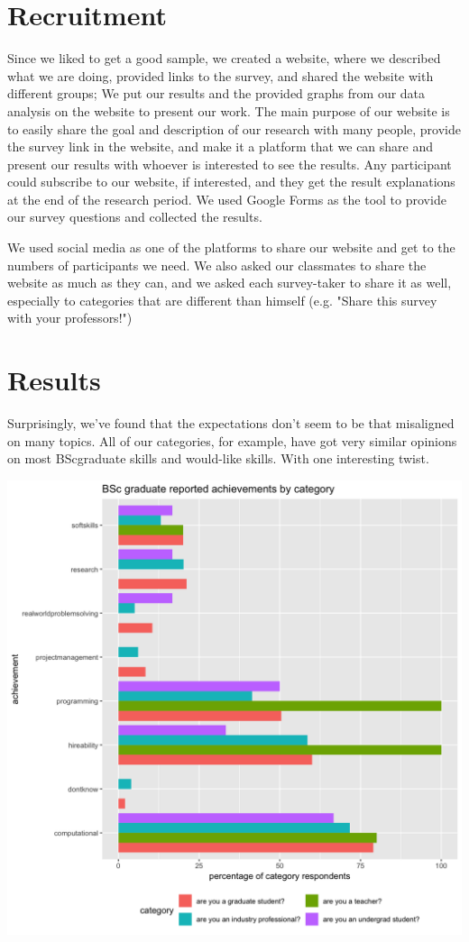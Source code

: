 \documentclass{sigchi}
\begin{document}
\section{Recruitment}
Since we liked to get a good sample, we created a website, where we described what we are doing, provided links to the survey, and shared the website with different groups; We put our results and the provided graphs from our data analysis on the website to present our work. The main purpose of our website is to easily share the goal and description of our research with many people, provide the survey link in the website, and make it a platform that we can share and present our results with whoever is interested to see the results. Any participant could subscribe to our website, if interested, and they get the result explanations at the end of the research period. We used Google Forms as the tool to provide our survey questions and collected the results.  

 We used social media as one of the platforms to share our website and get to the numbers of participants we need. We also asked our classmates to share the website as much as they can, and we asked each survey-taker to share it as well, especially to categories that are different than himself (e.g. "Share this survey with your professors!")

\section{Results}
Surprisingly, we've found that the expectations don't seem to be that misaligned on many topics. All of our categories, for example, have got very similar opinions on most BScgraduate skills and would-like skills. With one interesting twist.

\includegraphics[scale=0.2]{../data-analysis/plots_output/BSc_graduate_reported_achievements_by_category.png}
\end{document}
